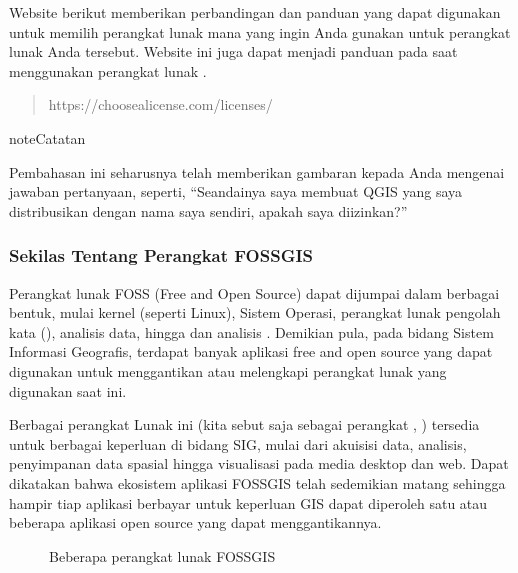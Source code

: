 \documentclass[letterpaper,10pt,english]{sphinxmanual}
\begin{document}
Website berikut memberikan perbandingan dan panduan yang dapat digunakan untuk memilih perangkat lunak mana yang ingin Anda gunakan untuk perangkat lunak Anda tersebut. Website ini juga dapat menjadi panduan pada saat menggunakan perangkat lunak .
\begin{quote}

https://choosealicense.com/licenses/
\end{quote}

\begin{sphinxadmonition}{note}{Catatan}

Pembahasan ini seharusnya telah memberikan gambaran kepada Anda mengenai jawaban pertanyaan, seperti, “Seandainya saya membuat QGIS yang saya distribusikan dengan nama saya sendiri, apakah saya diizinkan?”
\end{sphinxadmonition}


\subsubsection{Sekilas Tentang Perangkat FOSS\sphinxhyphen{}GIS}
\label{\detokenize{sesi1/fossgis:sekilas-tentang-perangkat-foss-gis}}
Perangkat lunak FOSS (Free and Open Source) dapat dijumpai dalam berbagai bentuk, mulai kernel (seperti Linux), Sistem Operasi, perangkat lunak pengolah kata (), analisis data, hingga  dan analisis . Demikian pula, pada bidang Sistem Informasi Geografis, terdapat banyak aplikasi free and open source yang dapat digunakan untuk menggantikan atau melengkapi perangkat lunak  yang digunakan saat ini.

Berbagai perangkat Lunak ini (kita sebut saja sebagai perangkat , ) tersedia untuk berbagai keperluan di bidang SIG, mulai dari akuisisi data, analisis, penyimpanan data spasial hingga visualisasi pada media desktop dan web. Dapat dikatakan bahwa ekosistem aplikasi FOSS\sphinxhyphen{}GIS telah sedemikian matang sehingga hampir tiap aplikasi berbayar untuk keperluan GIS dapat diperoleh satu atau beberapa aplikasi open source yang dapat menggantikannya.

\begin{figure}[htbp]
\centering
\capstart

\noindent{}
\caption{Beberapa perangkat lunak FOSS\sphinxhyphen{}GIS}\label{\detokenize{sesi1/fossgis:fossgisapp}}\end{figure}
\end{document}
